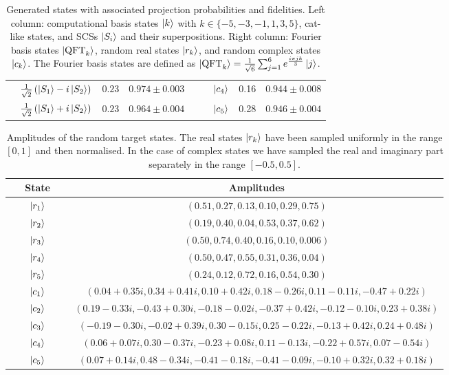 \begin{table}[tbh]
\begin{tabular}{lcc|lcc}
$\quad\frac{1}{\sqrt{2}}\left(\ket{S_1}-i\ket{S_2}\right)$ & $0.23$ & $0.974 \pm 0.003\quad$&$\quad\ket{c_4}$ & 0.16 & $0.944\pm0.008$\\
$\quad\frac{1}{\sqrt{2}}\left(\ket{S_1}+i\ket{S_2}\right)$ & $0.23$ & $0.964 \pm 0.004\quad$& $\quad\ket{c_5}$ & 0.28 & $0.946\pm0.004$\\
\bottomrule
\end{tabular}
\caption{%
	Generated states with associated projection probabilities and fidelities.
	Left column: computational basis states $\ket k$ with $k\in\{-5,-3,-1,1,3,5\}$, cat-like states, and \acp{SCS} $\ket{S_i}$ and their superpositions.
	Right column: Fourier basis states $\ket{\operatorname{QFT}_k}$, random real states $\ket{r_k}$, and random complex states $\ket{c_k}$.
	The Fourier basis states are defined as $\ket{\operatorname{QFT}_k}=\frac{1}{\sqrt{6}}\sum_{j=1}^{6}e^{\frac{ i \pi jk }{3}}\ket{j}$.
}
\label{table:expQWs:summary}
\end{table}

\begin{table}[tbh]
\centering\footnotesize
\begin{tabular}{cc}
\toprule
State & Amplitudes \\
\midrule
$\qquad\ket{r_1}\qquad$& $\left( 0.51, 0.27, 0.13, 0.10, 0.29, 0.75\right)$\\
$\qquad\ket{r_2}\qquad$& $\left( 0.19, 0.40, 0.04, 0.53, 0.37, 0.62\right)$\\
$\qquad\ket{r_3}\qquad$&$\left( 0.50, 0.74, 0.40, 0.16, 0.10, 0.006\right)$ \\
$\qquad\ket{r_4}\qquad$& $\left( 0.50, 0.47, 0.55, 0.31, 0.36, 0.04\right)$ \\
$\qquad\ket{r_5}\qquad$& $\left( 0.24, 0.12, 0.72, 0.16, 0.54, 0.30\right)$ \\
$\qquad\ket{c_1}\qquad$& $\left( 0.04+0.35i, 0.34+0.41i, 0.10+0.42i, 0.18-0.26i, 0.11-0.11i, -0.47+0.22i\right)$  \\
$\qquad\ket{c_2}\qquad$& $\left( 0.19-0.33i, -0.43+0.30i, -0.18-0.02i, -0.37+0.42i, -0.12-0.10i, 0.23+0.38i\right)$\\
$\qquad\ket{c_3}\qquad$& $\left( -0.19-0.30i, -0.02+0.39i, 0.30-0.15i, 0.25-0.22i, -0.13+0.42i, 0.24+0.48i\right)$\\
$\qquad\ket{c_4}\qquad$& $\left( 0.06+0.07i, 0.30-0.37i, -0.23+0.08i, 0.11-0.13i, -0.22+0.57i, 0.07-0.54i\right)$\\
$\qquad\ket{c_5}\qquad$& $\left( 0.07+0.14i, 0.48-0.34i, -0.41-0.18i, -0.41-0.09i, -0.10+0.32i, 0.32+0.18i\right)$\\
\bottomrule
\end{tabular}
\caption{
	Amplitudes of the random target states.
	The real states $\ket{r_k}$ have been sampled uniformly in the range $\left[0,1\right]$ and then normalised. In the case of complex states we have sampled the real and imaginary part separately in the range $\left[-0.5,0.5\right]$.
}
\label{table:expQWs:random_states_amps}
\end{table}


